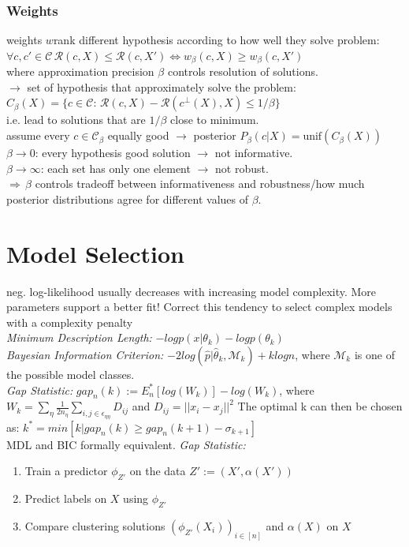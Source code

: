 \documentclass[9pt,parskip]{scrartcl}
\begin{document}
\begin{multicols*}{4}
\subsubsection*{Weights}
weights $w$rank different hypothesis according to how well they solve problem: \\
$\forall c, c' \in \mathcal{C} \, \mathcal{R}(c,X) \leq \mathcal{R}(c,X') \Leftrightarrow w_{\beta}(c,X) \geq w_{\beta}(c,X')$ \\
where approximation precision $\beta$ controls resolution of solutions. \\
$\to$ set of hypothesis that approximately solve the problem: \\$C_{\beta}(X)= \{c \in \mathcal{C} : \, \mathcal{R} (c,X) - \mathcal{R}(c^{\bot}(X),X) \leq 1/\beta \}$ \\
i.e. lead to solutions that are $1/\beta$ close to minimum. \\
assume every $c \in \mathcal{C}_{\beta}$ equally good $\to$ posterior $P_{\beta}(c|X) = \text{unif}(C_{\beta}(X))$ \\
$\beta \to 0$: every hypothesis good solution $\to$ not informative. \\
$\beta \to \infty$: each set has only one element $\to$ not robust. \\
$ \Rightarrow \, \beta$ controls tradeoff between informativeness and robustness/how much posterior distributions agree for different values of $\beta$.


\section*{Model Selection}
neg. log-likelihood usually decreases with increasing model complexity. More
parameters support a better fit!
Correct this tendency to select complex models with a
complexity penalty \\
\textit{Minimum Description Length: } $-log p (x|\theta_k) - log p(\theta_k)$ \\

\textit{Bayesian Information Criterion:} $-2 log (\hat p | \hat \theta_k, \mathcal{M}_k)  + k log n$, where $\mathcal{M}_k$ is one of the possible model classes. \\
\textit{Gap Statistic:} $gap_n(k) := E_n^*[log(W_k)] - log(W_k)$, where $W_k = \sum_{\eta}\frac{1}{2n_{\eta}} \sum_{i,j \in \epsilon_{\eta \eta}} D_{ij}$ and $D_{ij} = ||x_i -x_j||^2$
The optimal k can then be chosen as: $k^* = min[k|gap_n(k) \geq gap_n(k+1) - \sigma_{k+1}]$ \\
MDL and BIC formally equivalent.
\textit{Gap Statistic:}
\begin{enumerate}
    \item Train a predictor $\phi_{Z'}$ on the data $Z' := (X', \alpha(X'))$
    \item Predict labels on $X$ using $\phi_{Z'}$
    \item Compare clustering solutions $(\phi_{Z'}(X_i))_{i \in [n]}$ and $\alpha(X)$ on $X$
\end{enumerate}


\end{multicols*}
\end{document}
